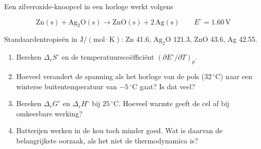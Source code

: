 \begin{oefening}
Een zilveroxide-knoopcel in een horloge werkt volgens

\[
\mathrm{Zn(s) + Ag_2O(s) \rightarrow ZnO(s) + 2\,Ag(s)} \qquad E^\circ = 1.60\,\mathrm{V}
\]

Standaardentropieën in \(\mathrm{J/(mol\cdot K)}\): Zn 41.6, \(\mathrm{Ag_2O}\) 121.3, ZnO 43.6, Ag 42.55.

\begin{enumerate}
\item[(a)]
  Bereken \(\Delta_r S^\circ\) en de temperatuurscoëfficiënt \((\partial E^\circ/\partial T)_p\).
\item[(b)]
  Hoeveel verandert de spanning als het horloge van de pols (\(32\,^\circ\mathrm{C}\)) naar een winterse buitentemperatuur van \(-5\,^\circ\mathrm{C}\) gaat? Is dat veel?
\item[(c)]
  Bereken \(\Delta_r G^\circ\) en \(\Delta_r H^\circ\) bij \(25\,^\circ\mathrm{C}\). Hoeveel warmte geeft de cel af bij omkeerbare werking?
\item[(d)]
  Batterijen werken in de kou toch minder goed. Wat is daarvan de belangrijkste oorzaak, als het niet de thermodynamica is?
\end{enumerate}
\end{oefening}

